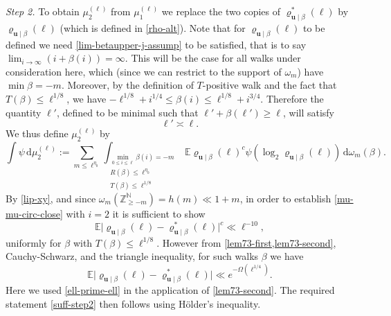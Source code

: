 \documentclass[11pt,reqno]{amsart}
\numberwithin{equation}{section}
\theoremstyle{definition}
\theoremstyle{remark}
\newcommand{\mb}{\mathbb}
\newcommand{\mbf}{\mathbf}
\renewcommand{\le}{\leqslant}
\renewcommand{\ge}{\geqslant}
\newcommand\Z{\mathbb{Z}}
\newcommand\N{\mathbb{N}}
\begin{document}
\emph{Step 2.} To obtain $\mu_2^{(\ell)}$ from $\mu_1^{(\ell)}$ we replace the two copies of $\varrho^*_{\mbf{u} \mid \beta}(\ell)$ by $\varrho_{\mbf{u} \mid \beta}(\ell)$ (which is defined in \cref{rho-alt}). Note that for $\varrho_{\mbf{u} \mid \beta}(\ell)$ to be defined we need \cref{lim-betaupper-j-assump} to be satisfied, that is to say $\lim_{i \rightarrow \infty}(i + \beta(i)) = \infty$. This will be the case for all walks under consideration here, which (since we can restrict to the support of $\omega_m$) have $\min \beta = -m$. Moreover, by the definition of $T$-positive walk and the fact that $T(\beta) \le \ell^{1/8}$, we have $- \ell^{1/8} + i^{1/4} \le \beta(i) \le \ell^{1/8} + i^{3/4}$. Therefore the quantity $\ell'$, defined to be minimal such that $\ell' + \beta(\ell') \ge \ell$, will satisfy
\begin{equation}\label{ell-prime-ell} \ell' \asymp \ell .\end{equation}
We thus define $\mu_2^{(\ell)}$ by
\[ \int \psi \, \mathrm{d} \mu_2^{(\ell)} := \sum_{m \le \ell^{\eta_0}}\int_{\substack{\min_{0 \le i \le \ell} \beta(i) = -m \\ R(\beta) \le \ell^{\eta_0} \\ T(\beta) \le \ell^{1/8}}} \mb{E} \varrho_{\mbf{u} \mid \beta}(\ell)^c \psi (\log_2 \varrho_{\mbf{u} \mid \beta}(\ell)) \, \mathrm{d}\omega_m(\beta).\]
By \cref{lip-xy}, and since $\omega_m(\Z^{\N}_{\ge -m}) = h(m) \ll 1 + m$, in order to establish \cref{mu-mu-circ-close} with $i = 2$ it is sufficient to show
\begin{equation}\label{suff-step2} \mb{E}\big| \varrho_{\mbf{u} \mid \beta}(\ell) - \varrho^*_{\mbf{u} \mid \beta}(\ell) \big|^c \ll \ell^{-10},\end{equation} 
uniformly for $\beta$ with $T(\beta) \le \ell^{1/8}$. However from \cref{lem73-first,lem73-second}, Cauchy-Schwarz, and the triangle inequality, for such walks $\beta$ we have 
\[ \mb{E}\big| \varrho_{\mbf{u} \mid \beta}(\ell) - \varrho^*_{\mbf{u} \mid \beta}(\ell) \big| \ll e^{-\Omega(\ell^{1/4})}.\]
Here we used \cref{ell-prime-ell} in the application of \cref{lem73-second}. The required statement \cref{suff-step2} then follows using H\"older's inequality.\vspace*{10pt}
\end{document}
